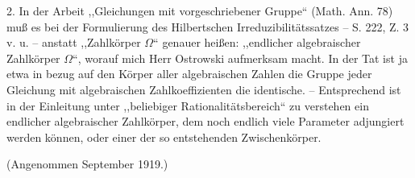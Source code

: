 \documentclass[11pt]{article}
\begin{document}
2. In der Arbeit ,,Gleichungen mit vorgeschriebener Gruppe`` (Math. Ann. 78) muß es bei der Formulierung des Hilbertschen Irreduzibilitätssatzes -- S. 222, Z. 3 v. u. -- anstatt ,,Zahlkörper $\Omega$`` genauer heißen: ,,endlicher algebraischer Zahlkörper $\Omega$``, worauf mich Herr Ostrowski aufmerksam macht. In der Tat ist ja etwa in bezug auf den Körper aller algebraischen Zahlen die Gruppe jeder Gleichung mit algebraischen Zahlkoeffizienten die identische. -- Entsprechend ist in der Einleitung unter ,,beliebiger Rationalitätsbereich`` zu verstehen ein endlicher algebraischer Zahlkörper, dem noch endlich viele Parameter adjungiert werden können, oder einer der so entstehenden Zwischenkörper.

\begin{center}
(Angenommen September 1919.)
\end{center}
\end{document}
